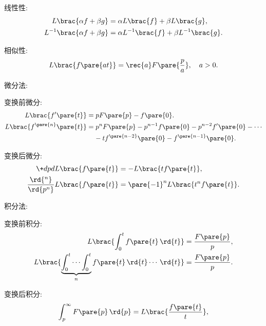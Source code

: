 \documentclass[../ComplexVariable.tex]{subfiles}
\begin{document}
\begin{finale}
\begin{theorem}[Laplace变换的性质]
    \mbox{}
    \begin{cenum}
        \item 线性性:
        \begin{align*}
            L\brac{\alpha f + \beta g} &= \alpha L\brac{f} + \beta L\brac{g},\\ L^{-1}\brac{\alpha f + \beta g} &= \alpha L^{-1}\brac{f} + \beta L^{-1}\brac{g}.
        \end{align*}
        \item 相似性:
        \[ L\brac{f\pare{at}} = \rec{a}F\pare{\frac{p}{a}},\quad a>0. \]
        \item 微分法:
        \begin{cenum}
            \item 变换前微分:
            \begin{align*}
            L\brac{f'\pare{t}} &= pF\pare{p} - f\pare{0}. \\
            L\brac{f^{\pare{n}}\pare{t}} &= p^n F\pare{p} - p^{n-1}f\pare{0} - p^{n-2}f'\pare{0} - \cdots \\ & \phantom{=}\  - tf^{\pare{n-2}}\pare{0} - f^{\pare{n-1}}\pare{0}.
        \end{align*}
            \item 变换后微分:
            \begin{align*}
                \+dpd{}L\brac{f\pare{t}} &= -L\brac{tf\pare{t}}, \\
                \frac{\rd{^n}}{\rd{p^n}}L\brac{f\pare{t}} &= \pare{-1}^n L\brac{t^n f\pare{t}}.
            \end{align*}
        \end{cenum}
        \item 积分法:
        \begin{cenum}
            \item 变换前积分:
            \begin{align*}
                L\brac{\int_0^t f\pare{t}\,\rd{t}} &= \frac{F\pare{p}}{p}, \\
                L\brac{\underbrace{\int_0^t \cdots \int_0^t}_{n} f\pare{t}\,\rd{t}\cdots \,\rd{t}} &= \frac{F\pare{p}}{p}.
            \end{align*}
            \item 变换后积分:
            \begin{align*}
                \int_p^\infty F\pare{p}\,\rd{p} &= L\brac{\frac{f\pare{t}}{t}}, \\

\end{align*}
\end{cenum}
\end{cenum}
\end{theorem}
\end{finale}
\end{document}
